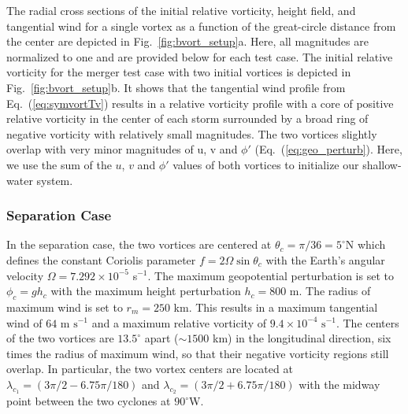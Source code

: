 %
The radial cross sections of the initial relative vorticity, height field, and tangential wind for a single vortex as a 
function of the great-circle distance from the center are depicted in 
Fig.~\ref{fig:bvort_setup}a.  Here, all magnitudes are
normalized to one and are provided below for each test case.  The initial
relative vorticity for the merger test case with two initial vortices is depicted in 
Fig.~\ref{fig:bvort_setup}b.  It shows that the tangential wind profile from
Eq.~(\ref{eq:symvortTv}) results in a relative vorticity profile with a core of
positive relative vorticity in the center of each storm surrounded 
by a broad ring of negative vorticity with relatively small magnitudes. 
The two vortices slightly overlap with very 
minor magnitudes of u, v and $\phi'$ (Eq.~(\ref{eq:geo_perturb}). 
Here, we use the sum of the $u$, $v$ and $\phi'$ values of both 
vortices to initialize our shallow-water system.


\subsubsection{Separation Case}
\label{subsubsec:separation}

In the separation case, the two vortices
are centered at $\theta_c= \pi/36 = 5^\circ$N which defines the constant Coriolis parameter 
$f = 2 \Omega \sin\theta_c$ with the Earth's angular velocity $\Omega = 7.292 \times 10^{-5}$ s$^{-1}$. The maximum geopotential perturbation is set to
$\phi_c = g h_c$ with the maximum height perturbation $h_c=800$ m.
The radius of maximum wind is set to $r_m=250$ km.  This results
in a maximum tangential wind of $64 \text{ m s}^{-1}$ and a maximum
relative vorticity of $9.4 \times 10^{-4} \text{ s}^{-1}$.  The centers
of the two vortices are $13.5^\circ$ apart ($\sim 1500$ km) in the longitudinal direction, six
times the radius of maximum wind, so that their negative vorticity
regions still overlap.  In particular, the two vortex centers are located at 
$\lambda_{c_1} = (3\pi/2 - 6.75 \pi/180)$ and $\lambda_{c_2} = (3\pi/2 + 6.75\pi/180)$ with 
the midway point between the two cyclones at  $90^\circ$W.


